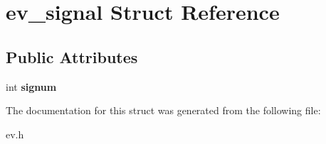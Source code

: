 \hypertarget{structev__signal}{}\section{ev\+\_\+signal Struct Reference}
\label{structev__signal}
\subsection*{Public Attributes}
\begin{DoxyCompactItemize}
\item 
\hypertarget{structev__signal_a6e2aa67420522727edd77c291bc29cbe}{}\label{structev__signal_a6e2aa67420522727edd77c291bc29cbe} 
int {\bfseries signum}
\end{DoxyCompactItemize}


The documentation for this struct was generated from the following file\+:\begin{DoxyCompactItemize}
\item 
ev.\+h\end{DoxyCompactItemize}
